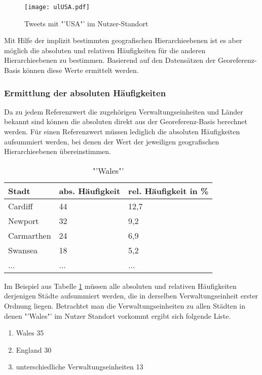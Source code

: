 			\begin{figure}[h!]
				\begin{center}
				\texttt{[image: ulUSA.pdf]}
				\caption{Tweets mit "'USA"' im Nutzer-Standort}
				\label{img:ulus}
				\end{center}
			\end{figure}

			Mit Hilfe der implizit bestimmten geografischen Hierarchieebenen ist es aber möglich die absoluten und relativen Häufigkeiten für die anderen Hierarchieebenen zu bestimmen.
			Basierend auf den Datensätzen der Georeferenz-Basis können diese Werte ermittelt werden.  

		\subsubsection{Ermittlung der absoluten Häufigkeiten} 

			Da zu jedem Referenzwert die zugehörigen Verwaltungseinheiten und Länder bekannt sind können die absoluten direkt aus der Georeferenz-Basis berechnet werden.
			Für einen Referenzwert müssen lediglich die absoluten Häufigkeiten aufsummiert werden, bei denen der Wert der jeweiligen geografischen Hierarchieebenen übereinstimmen.

			\begin{table}[h]
			\centering
			\caption{"'Wales"'}
			\label{tab:walesCity}
			\begin{tabular}{|l|l|l|}
			\hline
			Stadt      & abs. Häufigkeit & rel. Häufigkeit in \% \\ \hline \hline
			Cardiff    & 44 			 & 12,7 \\ \hline
			Newport    & 32 			 & 9,2  \\ \hline
			Carmarthen & 24 			 & 6,9  \\ \hline
			Swansea    & 18 			 & 5,2  \\ \hline
			...    & ... & ...  \\ \hline
			\end{tabular}
			\end{table}


			Im Beispiel aus Tabelle \ref{tab:walesCity} müssen alle absoluten und relativen Häufigkeiten derjenigen Städte aufsummiert werden, die in derselben Verwaltungseinheit erster Ordnung liegen.
			Betrachtet man die Verwaltungseinheiten zu allen Städten in denen "'Wales"' im Nutzer Standort vorkommt ergibt sich folgende Liste.

			\begin{enumerate}
				\item Wales 35
				\item England 30
				\item unterschiedliche Verwaltungseinheiten 13
			\end{enumerate}


